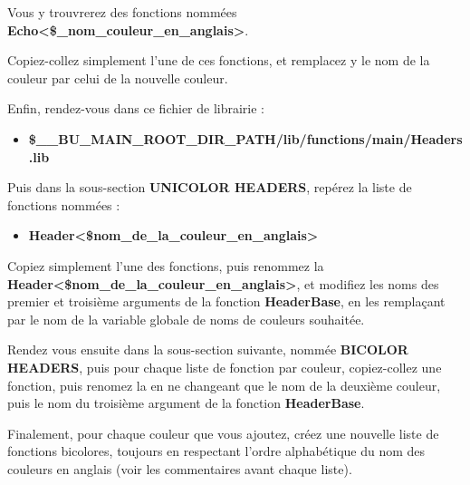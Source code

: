 \documentclass[a4paper,10pt]{article}
\begin{document}
\begin{justify}
	Vous y trouvrerez des fonctions nommées \textbf{\color{mauve}Echo<\$\_nom\_couleur\_en\_anglais>}.
\end{justify} 

\begin{justify}
Copiez-collez simplement l'une de ces fonctions, et remplacez y le nom de la couleur par celui de la nouvelle couleur.\\[1\baselineskip]
\end{justify}

\begin{justify}
	Enfin, rendez-vous dans ce fichier de librairie :
	
	\begin{itemize}	
		\item \textbf{\color{orange}\$\_\_BU\_MAIN\_ROOT\_DIR\_PATH\color{lime}/lib/functions/main/Headers.lib}
	\end{itemize}	
\end{justify}	

\begin{justify}
	Puis dans la sous-section \textbf{UNICOLOR HEADERS}, repérez la liste de fonctions nommées :

	\begin{itemize}
    	\item \textbf{\color{mauve}Header<\$nom\_de\_la\_couleur\_en\_anglais>}
	\end{itemize}
\end{justify}

\begin{justify}
	Copiez simplement l'une des fonctions, puis renommez la \textbf{\color{mauve}Header<\$nom\_de\_la\_couleur\_en\_anglais>},
et modifiez les noms des premier et troisième arguments de la fonction \textbf{\color{mauve}HeaderBase}, en les
remplaçant par le nom de la variable globale de noms de couleurs souhaitée.
\end{justify}

\begin{justify}
	Rendez vous ensuite dans la sous-section suivante, nommée \textbf{BICOLOR HEADERS}, puis pour chaque liste de fonction par couleur, copiez-collez une fonction, puis renomez la en ne changeant que le nom de la deuxième couleur, puis le nom du troisième argument de la fonction \textbf{\color{mauve}HeaderBase}.
\end{justify}

\begin{justify}
	Finalement, pour chaque couleur que vous ajoutez, créez une nouvelle liste de fonctions bicolores,
toujours en respectant l'ordre alphabétique du nom des couleurs en anglais (voir les commentaires
avant chaque liste).
\end{justify}
\end{document}
